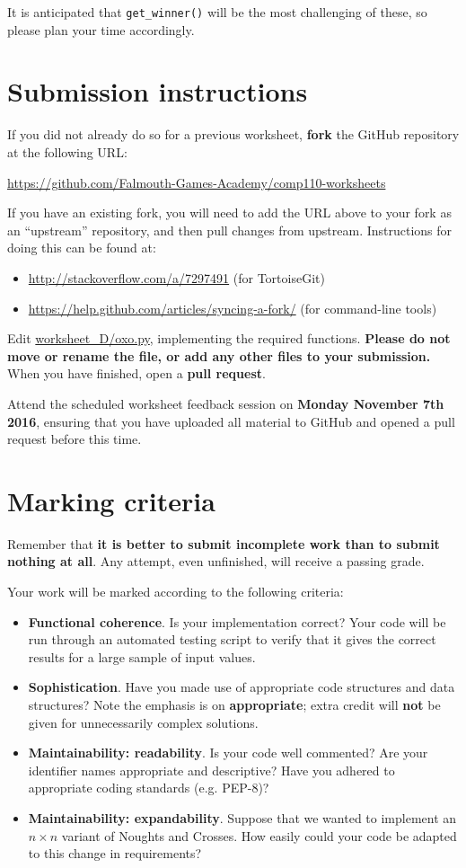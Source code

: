\documentclass{../../../fal_assignment}
\begin{document}
It is anticipated that \lstinline{get_winner()} will be the most challenging of these,
so please plan your time accordingly.

\section*{Submission instructions}

If you did not already do so for a previous worksheet, \textbf{fork} the GitHub repository at the following URL:

\url{https://github.com/Falmouth-Games-Academy/comp110-worksheets}

If you have an existing fork, you will need to add the URL above to your fork as an ``upstream'' repository,
and then pull changes from upstream. Instructions for doing this can be found at:
\begin{itemize}
	\item \url{http://stackoverflow.com/a/7297491} (for TortoiseGit)
	\item \url{https://help.github.com/articles/syncing-a-fork/} (for command-line tools)
\end{itemize}

Edit \url{worksheet_D/oxo.py}, implementing the required functions.
\textbf{Please do not move or rename the file, or add any other files to your submission.}
When you have finished, open a \textbf{pull request}.

Attend the scheduled worksheet feedback session on \textbf{Monday November 7th 2016},
ensuring that you have uploaded all material to GitHub and opened a pull request before this time.

\section*{Marking criteria}

Remember that \textbf{it is better to submit incomplete work than to submit nothing at all}.
Any attempt, even unfinished, will receive a passing grade.

Your work will be marked according to the following criteria:
\begin{itemize}
	\item \textbf{Functional coherence}. Is your implementation correct?
		Your code will be run through an automated testing script to verify that it gives the correct results for a large sample of input values.
	\item \textbf{Sophistication}. Have you made use of appropriate code structures and data structures?
		Note the emphasis is on \textbf{appropriate}; extra credit will \textbf{not} be given for unnecessarily complex solutions.
	\item \textbf{Maintainability: readability}. Is your code well commented? Are your identifier names appropriate and descriptive?
		Have you adhered to appropriate coding standards (e.g. PEP-8)?
	\item \textbf{Maintainability: expandability}. Suppose that we wanted to implement an $n \times n$ variant of Noughts and Crosses.
		How easily could your code be adapted to this change in requirements?
\end{itemize}
\end{document}
